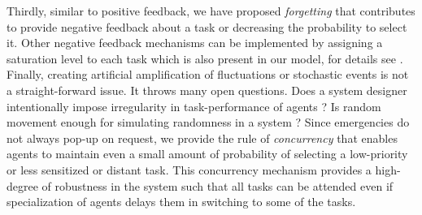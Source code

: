 Thirdly, similar to positive feedback, we have proposed {\em forgetting} that contributes to provide negative feedback about a task or decreasing the probability to select it. Other negative feedback mechanisms can be implemented by assigning a saturation level to each task which is also present in our model, for details see .\\
Finally, creating  artificial amplification of fluctuations or stochastic events is not a straight-forward issue. It throws  many open questions. Does a system designer intentionally impose irregularity in task-performance of agents ?  Is random movement  enough for simulating randomness in a system ?
Since emergencies do not always pop-up on request, we provide the rule of {\em concurrency} that enables agents to  maintain even a small amount of probability of selecting a low-priority or less sensitized or distant task. This concurrency mechanism provides a high-degree of robustness in the system such that all tasks can be attended even if specialization of agents delays them in switching to some of the tasks.
